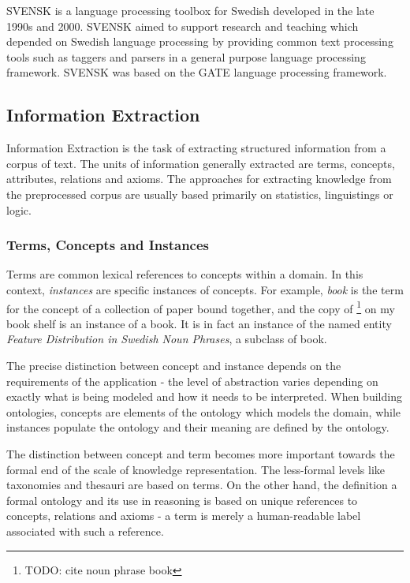 \documentclass[a4paper]{report}
\newcommand{\todo}[1]{\footnote{{\color{red} TODO: #1}}}
\begin{document}
SVENSK is a language processing toolbox for Swedish developed in the late 1990s and 2000\cite{OlssonGamback00SVENSK}. SVENSK aimed to support research and teaching which depended on Swedish language processing by providing common text processing tools such as taggers and parsers in a general purpose language processing framework. SVENSK was based on the GATE language processing framework.

\subsection{Information Extraction}

Information Extraction is the task of extracting structured information from a corpus of text.
The units of information generally extracted are terms, concepts, attributes, relations and axioms.
The approaches for extracting knowledge from the preprocessed corpus are usually based primarily on statistics, linguistings or logic.

\subsubsection{Terms, Concepts and Instances}

Terms are common lexical references to concepts within a domain.
In this context, \emph{instances} are specific instances of concepts.
For example, \emph{book} is the term for the concept of a collection of paper bound together, and the copy of \todo{cite noun phrase book} on my book shelf is an instance of a book.
It is in fact an instance of the named entity \emph{Feature Distribution in Swedish Noun Phrases}, a subclass of book.

The precise distinction between concept and instance depends on the requirements of the application - the level of abstraction varies depending on exactly what is being modeled and how it needs to be interpreted.
When building ontologies, concepts are elements of the ontology which models the domain, while instances populate the ontology and their meaning are defined by the ontology.

The distinction between concept and term becomes more important towards the formal end of the scale of knowledge representation.
The less-formal levels like taxonomies and thesauri are based on terms.
On the other hand, the definition a formal ontology and its use in reasoning is based on unique references to concepts, relations and axioms - a term is merely a human-readable label associated with such a reference.
\end{document}
